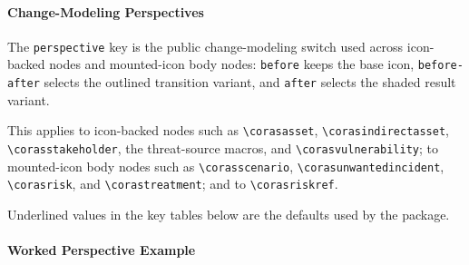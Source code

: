 \documentclass[a4paper]{article}
\begin{document}
\paragraph{Change-Modeling Perspectives}

The \texttt{perspective} key is the public change-modeling switch used across
icon-backed nodes and mounted-icon body nodes:
\texttt{before} keeps the base icon,
\texttt{before-after} selects the outlined transition variant, and
\texttt{after} selects the shaded result variant.

This applies to icon-backed nodes such as
\texttt{\textbackslash corasasset},
\texttt{\textbackslash corasindirectasset},
\texttt{\textbackslash corasstakeholder},
the threat-source macros, and
\texttt{\textbackslash corasvulnerability};
to mounted-icon body nodes such as
\texttt{\textbackslash corasscenario},
\texttt{\textbackslash corasunwantedincident},
\texttt{\textbackslash corasrisk}, and
\texttt{\textbackslash corastreatment};
and to
\texttt{\textbackslash corasriskref}.

Underlined values in the key tables below are the defaults used by the package.

\paragraph{Worked Perspective Example}

\begin{center}
\begin{corasassetdiagram}[x=.85cm,y=.85cm,layout=manual]
  \corasasset[
    at={(0,0)},
    title={Asset},
    perspective=before
  ]
  \corasindirectasset[
    at={(3.2,0)},
    title={Indirect\\Asset},
    perspective=before-after
  ]
  \corasstakeholder[
    at={(6.4,0)},
    title={Stakeholder},
    perspective=after
  ]
\end{corasassetdiagram}
\end{center}

\begin{center}
\begin{corastreatmentdiagram}[x=.85cm,y=.85cm,layout=manual]
  \corasscenario[
    at={(0,0)},
    title={Scenario},
    meta={1 per year},
    perspective=before
  ]
  \corasunwantedincident[
    at={(4.5,0)},
    title={Incident},
    perspective=before-after
  ]
  \corastreatment[
    at={(8.6,0)},
    title={Treatment},
    perspective=after
  ]
\end{corastreatmentdiagram}
\end{center}
\end{document}
